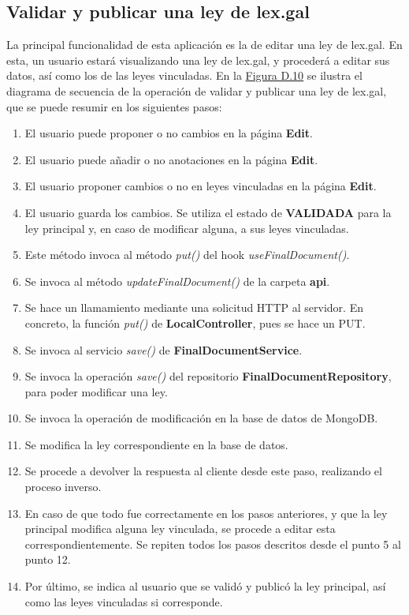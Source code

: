 \subsection{Validar y publicar una ley de lex.gal}

La principal funcionalidad de esta aplicación es la de editar una ley de lex.gal. En esta, un usuario estará visualizando una ley de lex.gal, y procederá a editar sus datos, así como los de las leyes vinculadas. En la \hyperref[enlaceDValidarLEXGAL]{Figura D.10} se ilustra el diagrama de secuencia de la operación de validar y publicar una ley de lex.gal, que se puede resumir en los siguientes pasos:

\begin{enumerate}
    \item El usuario puede proponer o no cambios en la página {\bf Edit}.
    \item El usuario puede añadir o no anotaciones en la página {\bf Edit}.
    \item El usuario proponer cambios o no en leyes vinculadas en la página {\bf Edit}.
    \item El usuario guarda los cambios. Se utiliza el estado de {\bf VALIDADA} para la ley principal y, en caso de modificar alguna, a sus leyes vinculadas.
    \item Este método invoca al método {\it put()} del hook {\it useFinalDocument()}.
    \item Se invoca al método {\it updateFinalDocument()} de la carpeta  {\bf api}.
    \item Se hace un llamamiento mediante una solicitud HTTP al servidor. En concreto, la función {\it put()} de {\bf LocalController}, pues se hace un PUT.
    \item Se invoca al servicio {\it save()} de {\bf FinalDocumentService}.
    \item Se invoca la operación {\it save()} del repositorio {\bf FinalDocumentRepository}, para poder modificar una ley.
    \item Se invoca la operación de modificación en la base de datos de MongoDB.
    \item Se modifica la ley correspondiente en la base de datos.
    \item Se procede a devolver la respuesta al cliente desde este paso, realizando el proceso inverso.
    \item En caso de que todo fue correctamente en los pasos anteriores, y que la ley principal modifica alguna ley vinculada, se procede a editar esta correspondientemente. Se repiten todos los pasos descritos desde el punto 5 al punto 12.
    \item Por último, se indica al usuario que se validó y publicó la ley principal, así como las leyes vinculadas si corresponde.
\end{enumerate}
